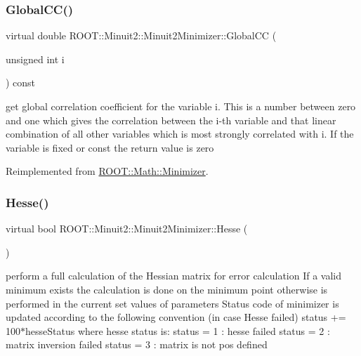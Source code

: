 \subsubsection{\texorpdfstring{GlobalCC()}{GlobalCC()}\hspace{0.1cm}{\footnotesize\ttfamily [2/2]}}
{\footnotesize\ttfamily virtual double R\+O\+O\+T\+::\+Minuit2\+::\+Minuit2\+Minimizer\+::\+Global\+CC (\begin{DoxyParamCaption}\item[{unsigned int}]{i }\end{DoxyParamCaption}) const\hspace{0.3cm}{\ttfamily [virtual]}}

get global correlation coefficient for the variable i. This is a number between zero and one which gives the correlation between the i-\/th variable and that linear combination of all other variables which is most strongly correlated with i. If the variable is fixed or const the return value is zero 

Reimplemented from \mbox{\hyperlink{classROOT_1_1Math_1_1Minimizer_a6b50b0b0ccb0cb23da281ef978d145c5}{R\+O\+O\+T\+::\+Math\+::\+Minimizer}}.

\mbox{\label{classROOT_1_1Minuit2_1_1Minuit2Minimizer_a0cfd04fde73c157de423705625ede51c}} 
\subsubsection{\texorpdfstring{Hesse()}{Hesse()}\hspace{0.1cm}{\footnotesize\ttfamily [1/2]}}
{\footnotesize\ttfamily virtual bool R\+O\+O\+T\+::\+Minuit2\+::\+Minuit2\+Minimizer\+::\+Hesse (\begin{DoxyParamCaption}{ }\end{DoxyParamCaption})\hspace{0.3cm}{\ttfamily [virtual]}}

perform a full calculation of the Hessian matrix for error calculation If a valid minimum exists the calculation is done on the minimum point otherwise is performed in the current set values of parameters Status code of minimizer is updated according to the following convention (in case Hesse failed) status += 100$\ast$hesse\+Status where hesse status is\+: status = 1 \+: hesse failed status = 2 \+: matrix inversion failed status = 3 \+: matrix is not pos defined 

